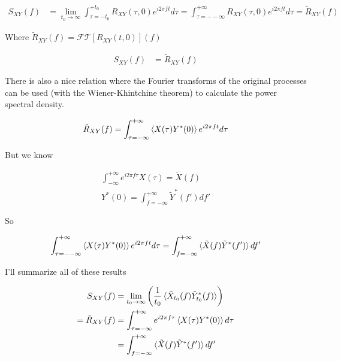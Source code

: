 \documentclass[12pt]{article}
\begin{document}
\begin{align}
S_{XY}(f) &= \lim_{t_0\rightarrow \infty}\int_{\tau=-t_0}^{+t_0} R_{XY}(\tau,0) e^{i 2\pi f t} d\tau = \int_{\tau=--\infty}^{+\infty}  R_{XY}(\tau,0) e^{i 2\pi f t} d\tau = \tilde{R}_{XY}(f)
\end{align}

Where $\tilde{R}_{XY}(f) = \mathcal{FT}[R_{XY}(t,0)](f)$

\begin{align}
S_{XY}(f) &= \tilde{R}_{XY}(f)
\end{align}

There is also a nice relation where the Fourier transforms of the original processes can be used (with the Wiener-Khintchine theorem) to calculate the power spectral density.

\begin{align}
\tilde{R}_{XY}(f) = \int_{\tau=-\infty}^{+\infty}  \braket{X(\tau)Y^*(0)} e^{i 2\pi f t} d\tau
\end{align}

But we know 

\begin{align}
\int_{-\infty}^{+\infty} e^{i2\pi f \tau} X(\tau) = \tilde{X}(f)\\
Y^*(0) = \int_{f=-\infty}^{+\infty} \tilde{Y}^*(f') df'
\end{align}

So

\begin{align}
\int_{\tau=--\infty}^{+\infty}  \braket{X(\tau)Y^*(0)} e^{i 2\pi f t} d\tau = \int_{f=-\infty}^{+\infty} \braket{\tilde{X}(f)\tilde{Y}^*(f')} df'
\end{align}

I'll summarize all of these results

\begin{align}
S_{XY}(f) &= \lim_{t_0\rightarrow \infty} \left( \frac{1}{t_0} \braket{\tilde{X}_{t_0}(f)\tilde{Y}_{t_0}^*(f)}\right)\\
= \tilde{R}_{XY}(f) &= \int_{\tau=-\infty}^{+\infty} e^{i2\pi f \tau} \braket{X(\tau)Y^*(0)} d\tau\\
&= \int_{f=-\infty}^{+\infty}\braket{\tilde{X}(f)\tilde{Y}^*(f')}df'
\end{align}
\end{document}
